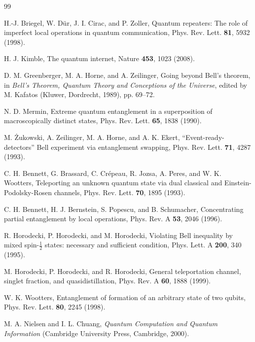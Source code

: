 \documentclass[reprint,aps,pra,superscriptaddress,nofootinbib,longbibliography]{revtex4-2}
\begin{document}
\begin{thebibliography}{99}

H.-J. Briegel, W. D\"ur, J. I. Cirac, and P. Zoller,
Quantum repeaters: The role of imperfect local operations in quantum communication,
Phys. Rev. Lett. \textbf{81}, 5932 (1998).

H. J. Kimble,
The quantum internet,
Nature \textbf{453}, 1023 (2008).

D. M. Greenberger, M. A. Horne, and A. Zeilinger,
Going beyond Bell's theorem,
in \textit{Bell's Theorem, Quantum Theory and Conceptions of the Universe},
edited by M. Kafatos (Kluwer, Dordrecht, 1989), pp. 69--72.

N. D. Mermin,
Extreme quantum entanglement in a superposition of macroscopically distinct states,
Phys. Rev. Lett. \textbf{65}, 1838 (1990).

M. \.{Z}ukowski, A. Zeilinger, M. A. Horne, and A. K. Ekert,
``Event-ready-detectors'' Bell experiment via entanglement swapping,
Phys. Rev. Lett. \textbf{71}, 4287 (1993).

C. H. Bennett, G. Brassard, C. Cr\'epeau, R. Jozsa, A. Peres, and W. K. Wootters,
Teleporting an unknown quantum state via dual classical and Einstein-Podolsky-Rosen channels,
Phys. Rev. Lett. \textbf{70}, 1895 (1993).

C. H. Bennett, H. J. Bernstein, S. Popescu, and B. Schumacher,
Concentrating partial entanglement by local operations,
Phys. Rev. A \textbf{53}, 2046 (1996).

R. Horodecki, P. Horodecki, and M. Horodecki,
Violating Bell inequality by mixed spin-\(\frac12\) states: necessary and sufficient condition,
Phys. Lett. A \textbf{200}, 340 (1995).

M. Horodecki, P. Horodecki, and R. Horodecki,
General teleportation channel, singlet fraction, and quasidistillation,
Phys. Rev. A \textbf{60}, 1888 (1999).

W. K. Wootters,
Entanglement of formation of an arbitrary state of two qubits,
Phys. Rev. Lett. \textbf{80}, 2245 (1998).

M. A. Nielsen and I. L. Chuang,
\textit{Quantum Computation and Quantum Information}
(Cambridge University Press, Cambridge, 2000).

\end{thebibliography}
\end{document}
